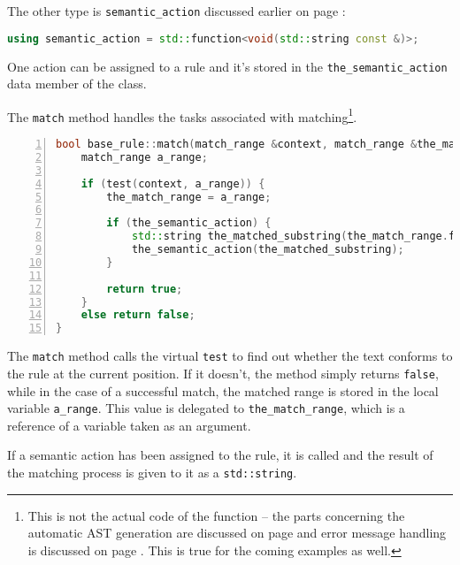 \documentclass[12pt]{article}
\begin{document}
The other type is \texttt{semantic\_action} discussed earlier on page \pageref{subsec:actions}:

\begin{center}
	\begin{minipage}[h]{0.8\textwidth}
		\begin{lstlisting}[language=C++, breaklines=true]
using semantic_action = std::function<void(std::string const &)>;
		\end{lstlisting}
	\end{minipage}
\end{center}

One action can be assigned to a rule and it's stored in the \texttt{the\_semantic\_action} data member of the
class.

The \texttt{match} method handles the tasks associated with matching\footnote{This is not the actual code of
the function -- the parts concerning the automatic AST generation are discussed on page \pageref{subsec:ast}
and error message handling is discussed on page \pageref{subsec:error}. This is true for the coming examples
as well.}.

\begin{center}
	\begin{minipage}[h]{0.8\textwidth}
		\begin{lstlisting}[language=C++, breaklines=true, numbers=left]
bool base_rule::match(match_range &context, match_range &the_match_range) {
	match_range a_range;

	if (test(context, a_range)) {
		the_match_range = a_range;

		if (the_semantic_action) {
			std::string the_matched_substring(the_match_range.first, the_match_range.second);
			the_semantic_action(the_matched_substring);
		}

		return true;
	}
	else return false;
}
		\end{lstlisting}
	\end{minipage}
\end{center}

The \texttt{match} method calls the virtual \texttt{test} to find out whether the text conforms to the rule at
the current position. If it doesn't, the method simply returns \texttt{false}, while in the case of a
successful match, the matched range is stored in the local variable \texttt{a\_range}. This value is delegated
to \texttt{the\_match\_range}, which is a reference of a variable taken as an argument.

If a semantic action has been assigned to the rule, it is called and the result of the matching process is
given to it as a \texttt{std::string}.
\end{document}
